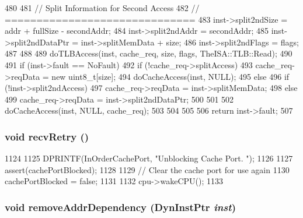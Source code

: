 \begin{DoxyCode}
{{480 
481         // Split Information for Second Access
482         // ==============================
483         inst->split2ndSize = addr + fullSize - secondAddr;
484         inst->split2ndAddr = secondAddr;            
485         inst->split2ndDataPtr = inst->splitMemData + size;
486         inst->split2ndFlags = flags;        
487     }
488     
489     doTLBAccess(inst, cache_req, size, flags, TheISA::TLB::Read);
490 
491     if (inst->fault == NoFault) {
492         if (!cache_req->splitAccess) {            
493             cache_req->reqData = new uint8_t[size];
494             doCacheAccess(inst, NULL);
495         } else {
496             if (!inst->split2ndAccess) {                
497                 cache_req->reqData = inst->splitMemData;
498             } else {
499                 cache_req->reqData = inst->split2ndDataPtr;                
500             }
501             
502             doCacheAccess(inst, NULL, cache_req);            
503         }        
504     }
505 
506     return inst->fault;
507 }
\end{DoxyCode}
\hypertarget{classCacheUnit_a29cb5a4f98063ce6e9210eacbdb35298}{
\subsubsection[{recvRetry}]{\setlength{\rightskip}{0pt plus 5cm}void recvRetry ()}}
\label{classCacheUnit_a29cb5a4f98063ce6e9210eacbdb35298}



\begin{DoxyCode}
1124 {
1125     DPRINTF(InOrderCachePort, "Unblocking Cache Port. \n");
1126     
1127     assert(cachePortBlocked);
1128 
1129     // Clear the cache port for use again
1130     cachePortBlocked = false;
1131 
1132     cpu->wakeCPU();
1133 }
\end{DoxyCode}
\hypertarget{classCacheUnit_a8a894d91761439227fd27d91a318c31f}{
\subsubsection[{removeAddrDependency}]{\setlength{\rightskip}{0pt plus 5cm}void removeAddrDependency ({\bf DynInstPtr} {\em inst})}}
\label{classCacheUnit_a8a894d91761439227fd27d91a318c31f}


